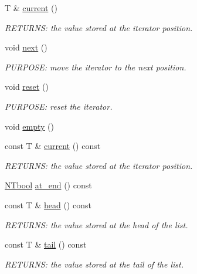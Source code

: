 \begin{DoxyCompactItemize}
T \& \hyperlink{class_n_t__list__o_aacfe14f556e5b37f6c8290bcf7a1eed7}{current} ()
\begin{DoxyCompactList}\small\item\em RETURNS: the value stored at the iterator position. \item\end{DoxyCompactList}\item 
void \hyperlink{class_n_t__list__o_a8730850f96bb8d7c1bb1922b417e758b}{next} ()
\begin{DoxyCompactList}\small\item\em PURPOSE: move the iterator to the next position. \item\end{DoxyCompactList}\item 
void \hyperlink{class_n_t__list__o_ad0cd761c858821cc4fa653a3699d4e12}{reset} ()
\begin{DoxyCompactList}\small\item\em PURPOSE: reset the iterator. \item\end{DoxyCompactList}\item 
void \hyperlink{class_n_t__list__o_a796931a401c9195b00377c6db199165c}{empty} ()
\item 
const T \& \hyperlink{class_n_t__list__o_a05d2f85f09f480aa64521b1dfb02c46b}{current} () const 
\begin{DoxyCompactList}\small\item\em RETURNS: the value stored at the iterator position. \item\end{DoxyCompactList}\item 
\hyperlink{nt__types_8h_a9f3200824a52174bb5be77bed3838822}{NTbool} \hyperlink{class_n_t__list__o_aac220578615ce1ef3e0dbd08b7f059ec}{at\_\-end} () const 
\item 
const T \& \hyperlink{class_n_t__list__o_a13ded9c23a451594a6b7179185eb7f62}{head} () const 
\begin{DoxyCompactList}\small\item\em RETURNS: the value stored at the head of the list. \item\end{DoxyCompactList}\item 
const T \& \hyperlink{class_n_t__list__o_a6602c859479513b88f129eea7f12a466}{tail} () const 
\begin{DoxyCompactList}\small\item\em RETURNS: the value stored at the tail of the list. \item\end{DoxyCompactList}\item 

\end{DoxyCompactItemize}
